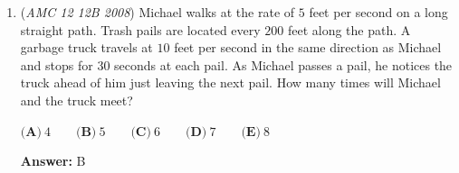 \begin{enumerate}
 $\textbf{(A)} \; 1 \qquad \textbf{(B)} \; \sqrt {2} \qquad \textbf{(C)} \; 2 \qquad \textbf{(D)} \; 2 \sqrt {2} \qquad \textbf{(E)} \; 4 \qquad$

 \textbf{Answer: }B



\textbf{Solution 1:}

We need only concern ourselves with the imaginary portions of $f(1)$ and $f(i)$ (both of which must be 0). These are:

 
 \begin{align*} \text{Im}(f(1)) & = i+i\text{Im}(\alpha)+i\text{Im}(\gamma) \\ \text{Im}(f(i)) & = -i+i\text{Re}(\alpha)+i\text{Im}(\gamma) \end{align*}


 Let $p=\text{Im}(\gamma)$ and $q=\text{Re}{(\gamma)},$ then we know $\text{Im}(\alpha)=-p-1$ and $\text{Re}(\alpha)=1-p.$ Therefore 
 \[|\alpha|+|\gamma|=\sqrt{(1-p)^2+(-1-p)^2}+\sqrt{q^2+p^2}=\sqrt{2p^2+2}+\sqrt{p^2+q^2},\] which reaches its minimum $\sqrt 2$ when $p=q=0$ by the Trivial Inequality. Thus, the answer is $\boxed B.$




\textbf{Solution 2:}

$f(1)=4+i+\alpha+\gamma$
$f(i)=-4-i+\alpha \cdot i +\gamma$

 Since $f(1)$ and $f(i)$ are both real we get, 
 \[\alpha+\gamma=-i\]
 \[\alpha \cdot i+\gamma=i\]

 Solving, we get $\alpha=1-i$, $\gamma$ can be anything, to minimize the value we set $\gamma=0$, so then the answer is $\sqrt{1^2+1^2}=\sqrt{2}$. Thus, the answer is $\boxed{B}$

 By: Quaratinium

 


	\item (\textit{AMC 12 12B 2008}) Michael walks at the rate of $5$ feet per second on a long straight path. Trash pails are located every $200$ feet along the path. A garbage truck travels at $10$ feet per second in the same direction as Michael and stops for $30$ seconds at each pail. As Michael passes a pail, he notices the truck ahead of him just leaving the next pail. How many times will Michael and the truck meet?


 $\textbf{(A)}\ 4\qquad \textbf{(B)}\ 5\qquad \textbf{(C)}\ 6\qquad \textbf{(D)}\ 7\qquad \textbf{(E)}\ 8$

 \textbf{Answer: }B




\end{enumerate}
